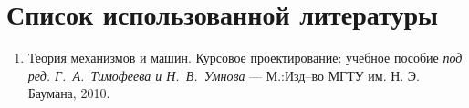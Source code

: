 \section*{Список использованной литературы}
	\begin{enumerate}
		\item  Теория механизмов и машин. Курсовое проектирование: учебное пособие \textit{под ред. Г.~А.~Тимофеева и Н.~В.~Умнова} --- М.:Изд--во МГТУ им. Н. Э. Баумана, 2010.
	\end{enumerate}
	
